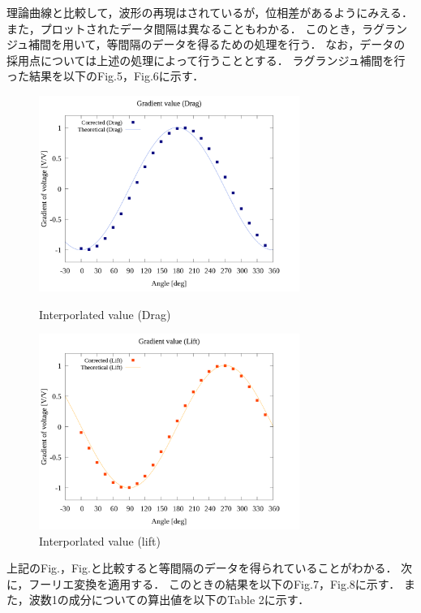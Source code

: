 \documentclass[twocolumn,a4j]{jsarticle}
\begin{document}
\newpage

理論曲線と比較して，波形の再現はされているが，位相差があるようにみえる．
また，プロットされたデータ間隔は異なることもわかる．
このとき，ラグランジュ補間を用いて，等間隔のデータを得るための処理を行う．
なお，データの採用点については上述の処理によって行うこととする．
ラグランジュ補間を行った結果を以下のFig.5，Fig.6に示す．

\begin{figure}[htbp]
    \begin{center}
        \includegraphics[width=85mm]{../../../02_workspace/result/simulation_tx=10.0_ty=-5.0_dx=5.00_dy=-2.50/plot/21/21-3_interpolated_drag.png}
        \caption{Interporlated value (Drag) }
        \includegraphics[width=85mm]{../../../02_workspace/result/simulation_tx=10.0_ty=-5.0_dx=5.00_dy=-2.50/plot/21/21-3_interpolated_lift.png}
        \caption{Interporlated value (lift) }
    \end{center}
\end{figure}

上記のFig.，Fig.と比較すると等間隔のデータを得られていることがわかる．
次に，フーリエ変換を適用する．
このときの結果を以下のFig.7，Fig.8に示す．
また，波数1の成分についての算出値を以下のTable 2に示す．
\end{document}
